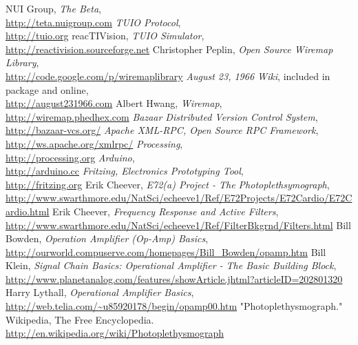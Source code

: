 \begin{thebibliography}{99}%
NUI Group, \textsl{The Beta},
\\ \mbox{}\hfill\url{http://teta.nuigroup.com}
\textsl{TUIO Protocol},
\\ \mbox{}\hfill\url{http://tuio.org}
reacTIVision, \textsl{TUIO Simulator},
\\ \mbox{}\hfill\url{http://reactivision.sourceforge.net}
Christopher Peplin, \textsl{Open Source Wiremap Library},
\\ \mbox{}\hfill\url{http://code.google.com/p/wiremaplibrary}
\textsl{August 23, 1966 Wiki}, included in package and online,
\\ \mbox{}\hfill\url{http://august231966.com}
Albert Hwang, \textsl{Wiremap},
\\ \mbox{}\hfill\url{http://wiremap.phedhex.com}
\textsl{Bazaar Distributed Version Control System},
\\ \mbox{}\hfill\url{http://bazaar-vcs.org/}
\textsl{Apache XML-RPC, Open Source RPC Framework},
\\ \mbox{}\hfill\url{http://ws.apache.org/xmlrpc/}
\textsl{Processing}, 
\\ \mbox{}\hfill\url{http://processing.org}
\textsl{Arduino},
\\ \mbox{}\hfill\url{http://arduino.cc}
\textsl{Fritzing, Electronics Prototyping Tool},
\\ \mbox{}\hfill\url{http://fritzing.org}
Erik Cheever, \textsl{E72(a) Project - The Photoplethsymograph},
\\ \mbox{}\hfill\url{http://www.swarthmore.edu/NatSci/echeeve1/Ref/E72Projects/E72Cardio/E72Cardio.html}
Erik Cheever, \textsl{Frequency Response and Active Filters},
\\ \mbox{}\hfill\url{http://www.swarthmore.edu/NatSci/echeeve1/Ref/FilterBkgrnd/Filters.html}
Bill Bowden, \textsl{Operation Amplifier (Op-Amp) Basics},
\\ \mbox{}\hfill\url{http://ourworld.compuserve.com/homepages/Bill\_Bowden/opamp.htm}
Bill Klein, \textsl{Signal Chain Basics: Operational Amplifier - The Basic Building Block},
\\ \mbox{}\hfill\url{http://www.planetanalog.com/features/showArticle.jhtml?articleID=202801320}
Harry Lythall, \textsl{Operational Amplifier Basics},
\\ \mbox{}\hfill\url{http://web.telia.com/~u85920178/begin/opamp00.htm}
"Photoplethysmograph." Wikipedia, The Free Encyclopedia.
\\ \mbox{}\hfill\url{http://en.wikipedia.org/wiki/Photoplethysmograph}
\end{thebibliography}
